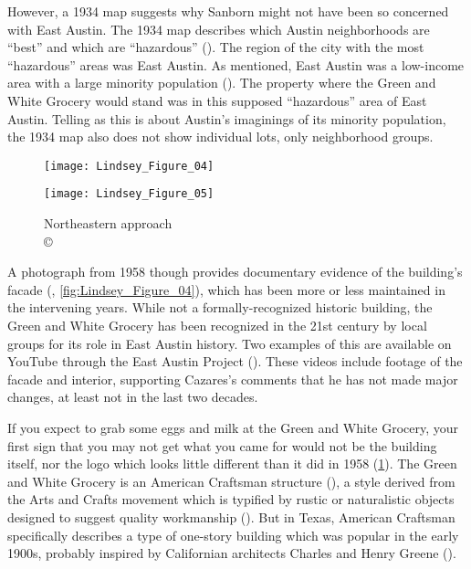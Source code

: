 However, a 1934 map suggests why Sanborn might not have been so concerned with East Austin. The 1934 map describes which Austin neighborhoods are “best” and which are “hazardous” (\cite{miller}). The region of the city with the most “hazardous” areas was East Austin. As mentioned, East Austin was a low-income area with a large minority population (\cite{hernandez}). The property where the Green and White Grocery would stand was in this supposed “hazardous” area of East Austin. Telling as this is about Austin's imaginings of its minority population, the 1934 map also does not show individual lots, only neighborhood groups.

\begin{figure}[!tb]
\begin{minipage}[t]{.49\linewidth}
	\texttt{[image: Lindsey\_Figure\_04]}
	\caption{Historic photo of the structure\\
		{\normalfont\scriptsize %
		Source:  \textcite{anon}.
	}}
	\label{fig:Lindsey_Figure_04}
\end{minipage}\hfill
\begin{minipage}[t]{.49\linewidth}
	\texttt{[image: Lindsey\_Figure\_05]}
	\caption{Northeastern approach\\
		{\normalfont\scriptsize \copyright\
			\shortauthor
	}}
	\label{fig:Lindsey_Figure_05}
\end{minipage}
\end{figure}

A photograph from 1958 though provides documentary evidence of the building's facade (\cite{anon}, \cref{fig:Lindsey_Figure_04}), which has been more or less maintained in the intervening years. While not a formally-recognized historic building, the Green and White Grocery has been recognized in the 21st century by local groups for its role in East Austin history. Two examples of this are available on YouTube through the East Austin Project (\cites{becker}{lepe}). These videos include footage of the facade and interior, supporting Cazares's comments that he has not made major changes, at least not in the last two decades.


If you expect to grab some eggs and milk at the Green and White Grocery, your first sign that you may not get what you came for would not be the building itself, nor the logo which looks little different than it did in 1958 (\cref{fig:Lindsey_Figure_05}). The Green and White Grocery is an American Craftsman structure (\cite[75-76]{hardy}), a style derived from the Arts and Crafts movement which is typified by rustic or naturalistic objects designed to suggest quality workmanship (\cite[42-56]{frampton}). But in Texas, American Craftsman specifically describes a type of one-story building which was popular in the early 1900s, probably inspired by Californian architects Charles and Henry Greene (\cite{robinson}).



